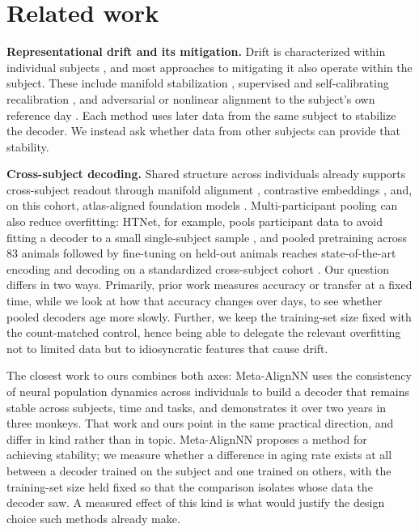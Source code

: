 \documentclass[mlabstract,onecolumn]{jmlr}
\begin{document}
\section{Related work}
\textbf{Representational drift and its mitigation.} Drift is characterized within individual
subjects \citep{rule2020,driscoll2017,schoonover2021,rule2019}, and most approaches to mitigating it
also operate within the subject. These include manifold stabilization \citep{degenhart2020},
supervised and self-calibrating recalibration \citep{jarosiewicz2015,wilson2025}, and adversarial or
nonlinear alignment to the subject's own reference day \citep{farshchian2019,karpowicz2025}. Each
method uses later data from the same subject to stabilize the decoder. We instead ask whether data
from other subjects can provide that stability.

\textbf{Cross-subject decoding.} Shared structure across individuals already supports cross-subject
readout through manifold alignment \citep{melbaum2022}, contrastive embeddings \citep{schneider2023},
and, on this cohort, atlas-aligned foundation models \citep{wicat2026}. Multi-participant pooling can
also reduce overfitting: HTNet, for example, pools participant data to avoid fitting a decoder to a
small single-subject sample \citep{peterson2021}, and pooled pretraining across 83 animals followed
by fine-tuning on held-out animals reaches state-of-the-art encoding and decoding on a standardized
cross-subject cohort \citep{neds2025}. Our question differs in two ways. Primarily, prior work
measures accuracy or transfer at a fixed time, while we look at how that accuracy changes over days,
to see whether pooled decoders age more slowly. Further, we keep the training-set size fixed with the
count-matched control, hence being able to delegate the relevant overfitting not to limited data but
to idiosyncratic features that cause drift.

The closest work to ours combines both axes: Meta-AlignNN \citep{metaalign2025} uses the consistency
of neural population dynamics across individuals to build a decoder that remains stable across
subjects, time and tasks, and demonstrates it over two years in three monkeys. That work and ours
point in the same practical direction, and differ in kind rather than in topic. Meta-AlignNN proposes
a method for achieving stability; we measure whether a difference in aging rate exists at all between
a decoder trained on the subject and one trained on others, with the training-set size held fixed so
that the comparison isolates whose data the decoder saw. A measured effect of this kind is what would
justify the design choice such methods already make.
\end{document}
